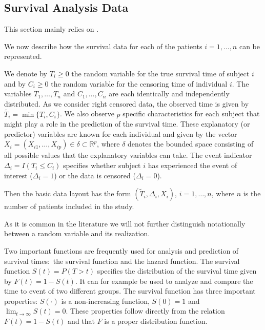 \documentclass[12pt, a4paper]{scrartcl}
\theoremstyle{definition}
\theoremstyle{plain}
\numberwithin{equation}{section}
\numberwithin{figure}{section}
\numberwithin{table}{section}
\begin{document}
	
	\subsection{Survival Analysis Data} \label{sabasics}
	
	This section mainly relies on \citet*{sabook}.
	
	We now describe how the survival data for each of the patients $i = 1, \dots, n$ can be represented.
	
	We denote by $T_i \geq 0$ the random variable for the true survival time of subject $i$ and by $C_i \geq 0$ the random variable for the censoring time of individual $i$.
	The variables $T_1,\dots,T_n$ and $C_1,\dots,C_n$ are each identically and independently distributed.
	As we consider right censored data, the observed time is given by $\tilde{T_i} = \min\{T_i,C_i\}$.
	We also observe $p$ specific characteristics for each subject that might play a role in the prediction of the survival time.
	These explanatory (or predictor) variables are known for each individual and given by the vector $X_i = (X_{i1}, \dots , X_{ip}) \in \delta \subset \mathbb{R}^p$, where $\delta$ denotes the bounded space consisting of all possible values that the explanatory variables can take.
	The event indicator $\Delta_i = I(T_i \leq C_i)$ specifies whether subject $i$ has experienced the event of interest ($\Delta_i=1$) or the data is censored ($\Delta_i=0$).
	
	Then the basic data layout has the form $(\tilde{T}_i, \Delta_i, X_i)$, $i = 1, \dots , n$, where $n$ is the number of patients included in the study.
	
	As it is common in the literature we will not further distinguish notationally between a random variable and its realization.
	
	
	Two important functions are frequently used for analysis and prediction of survival times:~the survival function and the hazard function.
	The survival function $S(t) = P(T > t)$ specifies the distribution of the survival time given by $F(t) = 1 - S(t)$.
	It can for example be used to analyze and compare the time to event of two different groups.
	The survival function has three important properties: $S(\cdot)$ is a non-increasing function, $S(0)=1$ and $\lim_{t \to \infty} S(t)=0$.
	These properties follow directly from the relation $F(t)=1-S(t)$ and that $F$ is a proper distribution function.
	
\end{document}
